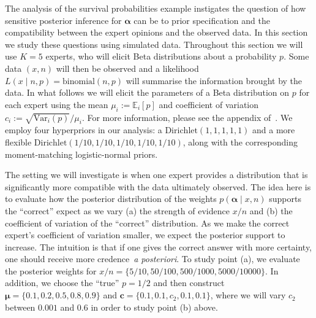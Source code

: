 \documentclass[a4paper, notitlepage, 10pt]{article}
\begin{document}
The analysis of the survival probabilities example instigates the question of how sensitive posterior inference for $\boldsymbol \alpha$ can be to prior specification and the compatibility between the expert opinions and the observed data.
In this section we study these questions using simulated data.
Throughout this section we will use $K = 5$ experts, who will elicit Beta distributions about a probability $p$.
Some data $(x, n)$ will then be observed and a likelihood $L(x \mid n, p) = \text{binomial}(n, p)$ will summarise the information brought by the data.
In what follows we will elicit the parameters of a Beta distribution on $p$ for each expert using the mean $\mu_i :=  \mathbb{E}_i[p]$ and coefficient of variation $c_i := \sqrt{\text{Var}_i(p)}/ \mu_i$.
For more information, please see the appendix of~\cite{Coelho2015}.
We employ four hyperpriors in our analysis: a $\text{Dirichlet}(1, 1, 1, 1, 1)$ and a more flexible $\text{Dirichlet}(1/10, 1/10, 1/10, 1/10, 1/10)$, along with the corresponding moment-matching logistic-normal priors.
% 

The
setting we will investigate is when one expert provides a distribution that is significantly more compatible with the data ultimately observed.
The idea here is to evaluate how the posterior distribution of the weights $p(\boldsymbol\alpha \mid x, n)$ supports the ``correct'' expect as we vary (a) the strength of evidence $x/n$ and (b) the coefficient of variation of the ``correct'' distribution.
As we make the correct expert's coefficient of variation smaller, we expect the posterior support to increase.
The intuition is that if one gives the correct answer with more certainty, one should receive more credence~\textit{a posteriori}.
To study point (a), we evaluate the posterior weights for $x/n = \{5/10, 50/100, 500/1000, 5000/10000 \}$.
In addition, we choose the ``true'' $p = 1/2$ and then construct $\boldsymbol\mu = \{0.1, 0.2, 0.5, 0.8, 0.9\}$ and $\boldsymbol c = \{0.1, 0.1, c_2, 0.1, 0.1 \}$, where we will vary $c_2$ between $0.001$ and $0.6$ in order to study point (b) above.
\end{document}
